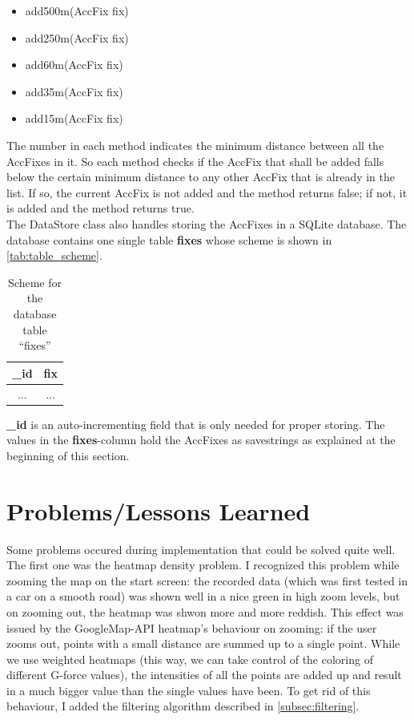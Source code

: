 \documentclass[10pt,a4paper]{article} %
\begin{document}
	\begin{itemize}
		\item add500m(AccFix fix)
		\item add250m(AccFix fix)
		\item add60m(AccFix fix)
		\item add35m(AccFix fix)
		\item add15m(AccFix fix)
	\end{itemize}

	The number in each method indicates the minimum distance between all the AccFixes in it. 
	So each method checks if the AccFix that shall be added falls below the certain minimum distance to any other AccFix that is already in the list.
	If so, the current AccFix is not added and the method returns false; if not, it is added and the method returns true.\\

	The DataStore class also handles storing the AccFixes in a SQLite database.
	The database contains one single table \textbf{fixes} whose scheme is shown in \autoref{tab:table_scheme}.

	\begin{table}[ht]
	  \centering
   
	  \begin{tabular}{c|c}
	   \_id & fix \\
	    \hline
	    	... & ...\\
	  \end{tabular}
	   \caption{Scheme for the database table ``fixes''} 
	   \label{tab:table_scheme}
	\end{table}

	\textbf{\_id} is an auto-incrementing field that is only needed for proper storing.
	The values in the \textbf{fixes}-column hold the AccFixes as savestrings as explained at the beginning of this section.
	
	\section{Problems/Lessons Learned}\label{sec:problems}

	Some problems occured during implementation that could be solved quite well.\\
	The first one was the heatmap density problem.
	I recognized this problem while zooming the map on the start screen: the recorded data (which was first tested in a car on a smooth road) was shown well in a nice green in high zoom levels, but on zooming out, the heatmap was shwon more and more reddish.
	This effect was issued by the GoogleMap-API heatmap's behaviour on zooming: if the user zooms out, points with a small distance are summed up to a single point.
	While we use weighted heatmaps (this way, we can take control of the coloring of different G-force values), the intensities of all the points are added up and result in a much bigger value than the single values have been.
	To get rid of this behaviour, I added the filtering algorithm described in \autoref{subsec:filtering}.\\
\end{document}
